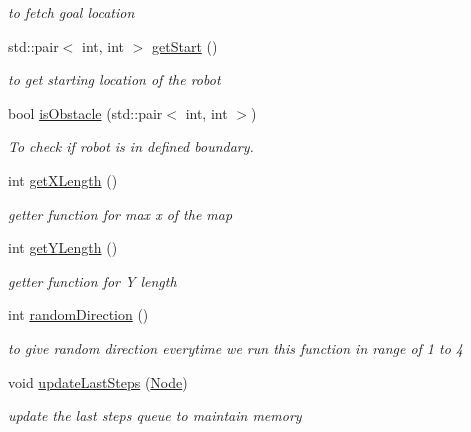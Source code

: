 \begin{DoxyCompactItemize}
\begin{DoxyCompactList}\small\item\em to fetch goal location \end{DoxyCompactList}\item 
std\+::pair$<$ int, int $>$ \hyperlink{classRandomPlanner_a0fb252bb39766353533c389f7392a6fd}{get\+Start} ()\hypertarget{classRandomPlanner_a0fb252bb39766353533c389f7392a6fd}{}\label{classRandomPlanner_a0fb252bb39766353533c389f7392a6fd}

\begin{DoxyCompactList}\small\item\em to get starting location of the robot \end{DoxyCompactList}\item 
bool \hyperlink{classRandomPlanner_a2311066614013953f01b0658652e6b5e}{is\+Obstacle} (std\+::pair$<$ int, int $>$)
\begin{DoxyCompactList}\small\item\em To check if robot is in defined boundary. \end{DoxyCompactList}\item 
int \hyperlink{classRandomPlanner_a1e0ae120157b58fb866da2305f80b86a}{get\+X\+Length} ()
\begin{DoxyCompactList}\small\item\em getter function for max x of the map \end{DoxyCompactList}\item 
int \hyperlink{classRandomPlanner_a01279711baee1ba008b280e5ec291aec}{get\+Y\+Length} ()
\begin{DoxyCompactList}\small\item\em getter function for Y length \end{DoxyCompactList}\item 
int \hyperlink{classRandomPlanner_af1ac348e7631e5e8817283d1148c3170}{random\+Direction} ()
\begin{DoxyCompactList}\small\item\em to give random direction everytime we run this function in range of 1 to 4 \end{DoxyCompactList}\item 
void \hyperlink{classRandomPlanner_a97938382e5e03ff5e3a6728bac85af86}{update\+Last\+Steps} (\hyperlink{structNode}{Node})
\begin{DoxyCompactList}\small\item\em update the last steps queue to maintain memory \end{DoxyCompactList}\item 

\end{DoxyCompactItemize}
